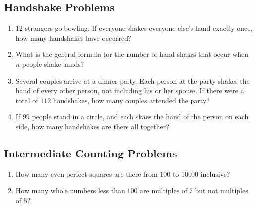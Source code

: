 \documentclass[twocolumn]{article}
\begin{document}
\subsection*{Handshake Problems}
\begin{enumerate}[resume]
	\item $12$ strangers go bowling. If everyone shakes everyone else's hand 
		exactly once, how many handshakes have occurred?
		\vspace{3cm}
	\item What is the general formula for the number of hand-shakes that occur 
		when $n$ people shake hands?
		\vspace{3cm}
	\item Several couples arrive at a dinner party. Each person at the party 
		shakes the hand of every other person, not including his or her spouse.  
		If there were a total of $112$ handshakes, how many couples attended the 
		party?
		\vspace{3cm}
	\item If $99$ people stand in a circle, and each skaes the hand of the 
		person on each side, how many handshakes are there all together?
		\vspace{3cm}
\end{enumerate}

\subsection*{Intermediate Counting Problems}
\begin{enumerate}[resume]
	\item How many even perfect squares are there from $100$ to $10000$ 
		inclusive?
		\vspace{3cm}
	\item How many whole numbers less than $100$ are multiples of $3$ but not 
		multiples of $5$?
		\vspace{3cm}
\end{enumerate}
\end{document}
